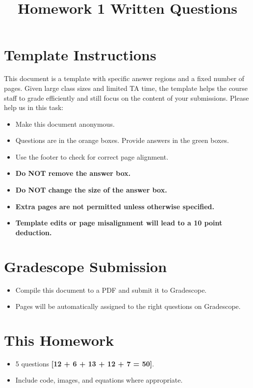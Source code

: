 \documentclass[11pt]{article}
\date{}
\title{\vspace{-1cm}Homework 1 Written Questions}
\begin{document}
\maketitle
\thispagestyle{fancy}

\section*{Template Instructions}

This document is a template with specific answer regions and a fixed number of pages. Given large class sizes and limited TA time, the template helps the course staff to grade efficiently and still focus on the content of your submissions. Please help us in this task:
 
\begin{itemize}
  \item Make this document anonymous.
  
  \item Questions are in the orange boxes. Provide answers in the green boxes.
  \item Use the footer to check for correct page alignment.

  \item \textbf{Do NOT remove the answer box.}
  \item \textbf{Do NOT change the size of the answer box.}
  \item \textbf{Extra pages are not permitted unless otherwise specified.}
  \item \textbf{Template edits or page misalignment will lead to a 10 point deduction.}
\end{itemize}

\section*{Gradescope Submission}
\begin{itemize}
  \item Compile this document to a PDF and submit it to Gradescope.
  \item Pages will be automatically assigned to the right questions on Gradescope.
\end{itemize}

\section*{This Homework}
\begin{itemize}
    \item 5 questions \textbf{[12 + 6 + 13 + 12 + 7 = 50]}.
    \item Include code, images, and equations where appropriate.
\end{itemize}
\end{document}
